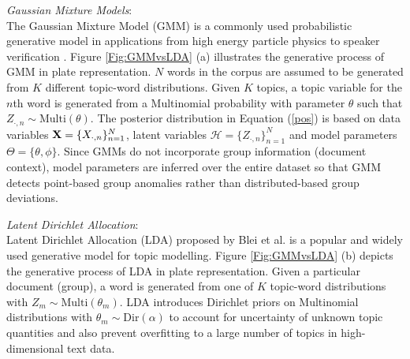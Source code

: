 

{\it Gaussian Mixture Models}:\\
The Gaussian Mixture Model (GMM) is a commonly used probabilistic generative model in applications from high energy particle physics \cite{GMM} to speaker verification \cite{speakerV}.    
Figure \ref{Fig:GMMvsLDA} (a) illustrates the generative process of GMM in plate representation. $N$ words in the corpus are assumed to be generated  from $K$ different topic-word distributions. 
Given $K$ topics, a topic variable for the $n$th word is generated from a Multinomial probability with parameter $\theta $ such that $Z_{\cdot,n} \sim \mbox{Multi}(\theta )$.    
The posterior distribution in Equation (\ref{pos}) is based on data variables ${\bf X}= \{ X_{{\cdot},n} \}_{n=1}^N $, latent variables $\mathcal{H}=\{Z_{\cdot,n}\}_{n=1}^N$ and model parameters $\Theta=\{\theta,\phi\}$.  Since GMMs do not incorporate  group information (document context),  model parameters are inferred  over the entire dataset so that GMM detects point-based group anomalies rather than distributed-based group deviations. 
 



{\it Latent Dirichlet Allocation}:\\
 Latent Dirichlet Allocation (LDA) proposed by Blei et al. \cite{LDA} is a  popular and widely used generative model  for topic modelling. Figure \ref{Fig:GMMvsLDA} (b) depicts the generative process of LDA in plate representation. 
Given a particular document (group), a word is generated from one of $K$ topic-word distributions with $Z_{m} \sim \mbox{Multi}(\theta_m )$.  LDA  introduces 
  Dirichlet priors on Multinomial distributions with $\theta_m \sim \mbox{Dir}(\alpha)$  to account for  uncertainty of unknown topic quantities and also prevent  overfitting to a large number of topics  in high-dimensional text data.

